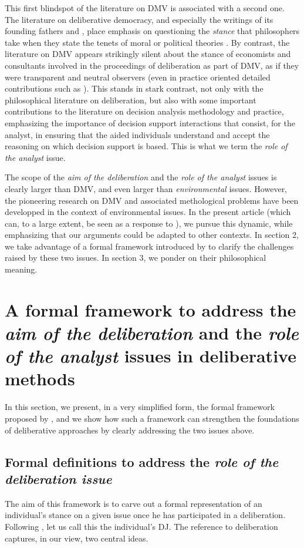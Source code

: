 \documentclass[version=3.21, pagesize, twoside=off, bibliography=totoc, DIV=calc, fontsize=12pt, a4paper, french, english]{scrartcl}
\begin{document}
This first blindspot of the literature on DMV is associated with a second one. The literature on deliberative democracy, and especially the writings of its founding fathers \citet{rawls_political_2005} and \citet{habermas_faktizitat_1992}, place emphasis on questioning the \emph{stance} that philosophers take when they state the tenets of moral or political theories \citep{meinard_du_2014}. 
By contrast, the literature on DMV appears strikingly silent about the stance of economists and consultants involved in the proceedings of deliberation as part of DMV, as if they were transparent and neutral observers (even in practice oriented detailed contributions such as \citet{schaafsma_guidance_2018}). 
This stands in stark contrast, not only with the philosophical literature on deliberation, but also with some important contributions to the literature on decision analysis methodology and practice, emphasizing the importance of decision support interactions that consist, for the analyst, in ensuring that the aided individuals understand and accept the reasoning on which decision support is based.
This is what we term the \emph{role of the analyst} issue.

The scope of the \emph{aim of the deliberation} and the \emph{role of the analyst} issues is clearly larger than DMV, and even larger than \emph{environmental} issues. 
However, the pioneering research on DMV and associated methological problems have been developped in the context of environmental issues. 
In the present article (which can, to a large extent, be seen as a response to \citet{bartkowski_beyond_2018}), we pursue this dynamic, while emphasizing that our arguments could be adapted to other contexts. In section 2, we take advantage of a formal framework introduced by \citet{cailloux_formal_2019} to clarify the challenges raised by these two issues.
In section 3, we ponder on their philosophical meaning.

\section{A formal framework to address the \emph{aim of the deliberation} and the \emph{role of the analyst} issues in deliberative methods}
In this section, we present, in a very simplified form, the formal framework proposed by \citet{cailloux_formal_2019}, and we show how such a framework can strengthen the foundations of deliberative approaches by clearly addressing the two issues above.

\subsection{Formal definitions to address the \emph{role of the deliberation issue}}
The aim of this framework is to carve out a formal representation of an individual's stance on a given issue once he has participated in a deliberation. 
Following \citet{cailloux_formal_2019}, let us call this the individual's \ac{DJ}. 
The reference to deliberation captures, in our view, two central ideas.
\end{document}
